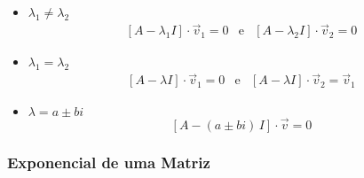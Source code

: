 \documentclass[11pt, a4paper]{article}
\begin{document}
\begin{itemize}
    \item $\lambda_1 \ne \lambda_2$
        \begin{equation*}
            \begin{matrix}
                \left[A - \lambda_1 I\right] \cdot \vec{v}_1 = 0 & \text{e} &
                \left[A - \lambda_2 I\right] \cdot \vec{v}_2 = 0
            \end{matrix}
        \end{equation*}
    \item $\lambda_1 = \lambda_2$
        \begin{equation*}
            \begin{matrix}
                \left[A - \lambda I\right] \cdot \vec{v}_1 = 0 & \text{e} &
                \left[A - \lambda I\right] \cdot \vec{v}_2 = \vec{v}_1
            \end{matrix}
        \end{equation*}
    \item $\lambda = a \pm bi$
        \begin{equation*}
                \left[A - (a \pm bi)\, I\right] \cdot \vec{v} = 0
        \end{equation*}
\end{itemize}

\subsubsection{Exponencial de uma Matriz}
\end{document}
